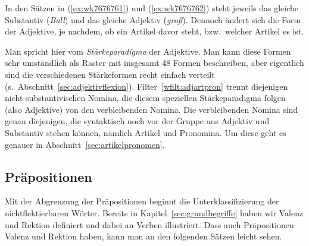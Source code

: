 In den Sätzen in (\ref{ex:wk7676761}) und (\ref{ex:wk7676762}) steht jeweils das gleiche Substantiv (\textit{Ball}) und das gleiche Adjektiv (\textit{groß}).
Dennoch ändert sich die Form der Adjektive, je nachdem, ob ein Artikel davor steht, bzw.\ welcher Artikel es ist.

\begin{exe}
  \ex\label{ex:wk7676761}
  \begin{xlist}
  \end{xlist}
  \ex\label{ex:wk7676762}
  \begin{xlist}
  \end{xlist}
\end{exe}

Man spricht hier vom \textit{Stärkeparadigma} der Adjektive.
Man kann diese Formen sehr umständlich als Raster mit insgesamt 48 Formen beschreiben, aber eigentlich sind die verschiedenen Stärkeformen recht einfach verteilt (s.\ Abschnitt~\ref{sec:adjektivflexion}).
Filter~\ref{wfilt:adjartpron} trennt diejenigen nicht-substantivischen Nomina, die diesem speziellen Stärkeparadigma folgen (also Adjektive) von den verbleibenden Nomina.
Die verbleibenden Nomina sind genau diejenigen, die syntaktisch noch vor der Gruppe aus Adjektiv und Substantiv stehen können, nämlich Artikel und Pronomina.
Um diese geht es genauer in Abschnitt~\ref{sec:artikelpronomen}.


\subsection{Präpositionen}

\label{sec:praepositionenwortklassen}


Mit der Abgrenzung der Präpositionen beginnt die Unterklassifizierung der nichtflektierbaren Wörter. 
Bereits in Kapitel~\ref{sec:grundbegriffe} haben wir Valenz und Rektion definiert und dabei an Verben illustriert.
Dass auch Präpositionen Valenz und Rektion haben, kann man an den folgenden Sätzen leicht sehen.

